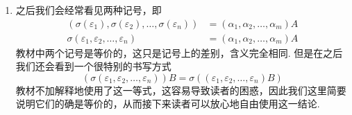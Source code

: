 \begin{enumerate}
    \item 之后我们会经常看见两种记号，即
          \begin{align*}
              (\sigma(\varepsilon_1),\sigma(\varepsilon_2),\ldots,\sigma(\varepsilon_n)) & =(\alpha_1,\alpha_2,\ldots,\alpha_m)A \\
              \sigma(\varepsilon_1,\varepsilon_2,\ldots,\varepsilon_n)                   & =(\alpha_1,\alpha_2,\ldots,\alpha_m)A
          \end{align*}
          教材中两个记号是等价的，这只是记号上的差别，含义完全相同. 但是在之后我们还会看到一个很特别的书写方式
          \[(\sigma(\varepsilon_1,\varepsilon_2,\ldots,\varepsilon_n))B=\sigma((\varepsilon_1,\varepsilon_2,\ldots,\varepsilon_n)B)\]
          教材不加解释地使用了这一等式，这容易导致读者的困惑，因此我们这里简要说明它们的确是等价的，从而接下来读者可以放心地自由使用这一结论.


\end{enumerate}
